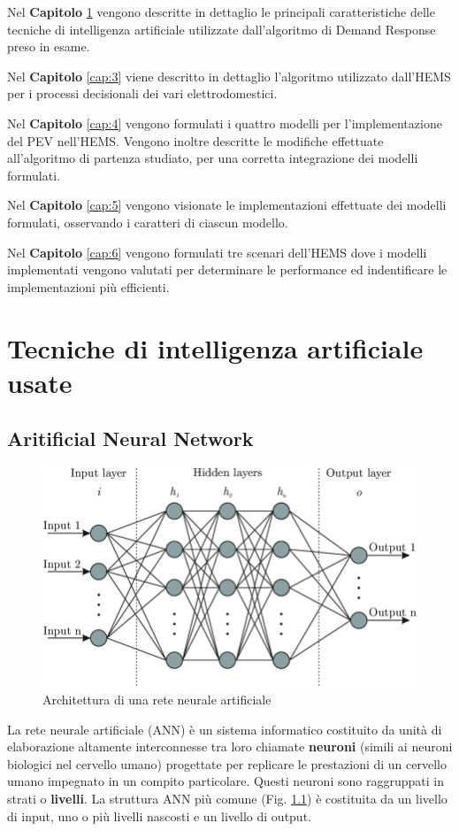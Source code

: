 \documentclass[italian, Lau, oneside]{sapthesis}
\begin{document}
Nel \textbf{Capitolo} \ref{cap:2} vengono descritte in dettaglio le principali caratteristiche delle tecniche di intelligenza artificiale utilizzate dall'algoritmo di Demand Response preso in esame. 

Nel \textbf{Capitolo} \ref{cap:3} viene descritto in dettaglio l'algoritmo utilizzato dall'HEMS per i processi decisionali dei vari elettrodomestici.

Nel \textbf{Capitolo} \ref{cap:4} vengono formulati i quattro modelli per l'implementazione del PEV nell'HEMS. Vengono inoltre descritte le modifiche effettuate all'algoritmo di partenza studiato, per una corretta integrazione dei modelli formulati.

Nel \textbf{Capitolo} \ref{cap:5} vengono visionate le implementazioni effettuate dei modelli formulati, osservando i caratteri di ciascun modello.

Nel \textbf{Capitolo} \ref{cap:6} vengono formulati tre scenari dell'HEMS dove i modelli implementati vengono valutati per determinare le performance ed indentificare le implementazioni più efficienti. 


\chapter{Tecniche di intelligenza artificiale usate}
\label{cap:2}
\section{Aritificial Neural Network}
\label{sec:ANN}
\begin{figure}[h]
    \centering
    \includegraphics[width=\textwidth]{ANN.png}
    \caption{Architettura di una rete neurale artificiale}
    \label{fig:ANN}
\end{figure}
La rete neurale artificiale (ANN) è un sistema informatico costituito da unità di elaborazione altamente interconnesse tra loro chiamate \textbf{neuroni} (simili ai neuroni biologici nel cervello umano) progettate per replicare le prestazioni di un cervello umano impegnato in un compito particolare. Questi neuroni sono raggruppati in strati o \textbf{livelli}. La struttura ANN più comune (Fig. \ref{fig:ANN}) è costituita da un livello di input, uno o più livelli nascosti e un livello di output. 
\end{document}
